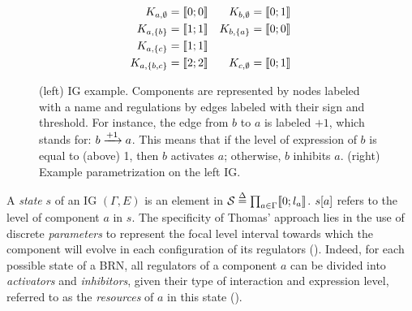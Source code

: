 \begin{figure}[t]
\begin{minipage}{0.4\linewidth}
\centering
{}
\end{minipage}
\begin{minipage}{0.6\linewidth}
\centering
\begin{align*}
K_{a,\emptyset} &= \llbracket 0 ; 0 \rrbracket & K_{b,\emptyset} &= \llbracket 0 ; 1 \rrbracket \\
K_{a,\{b\}} &= \llbracket 1 ; 1 \rrbracket & K_{b,\{a\}} &= \llbracket 0 ; 0 \rrbracket \\
K_{a,\{c\}} &= \llbracket 1 ; 1 \rrbracket &&\\
K_{a,\{b,c\}} &= \llbracket 2 ; 2 \rrbracket & K_{c,\emptyset} &= \llbracket 0 ; 1 \rrbracket
\end{align*}
\end{minipage}
\caption{\label{fig:runningBRN}
(left)
IG example.
Components are represented by nodes labeled with a name
and regulations by edges labeled with their sign and threshold.
For instance, the edge from $b$ to $a$ is labeled $+1$, which stands for: $b \xrightarrow{+ 1} a$.
This means that if the level of expression of $b$ is equal to (\ie above) 1, then $b$ activates $a$;
otherwise, $b$ inhibits $a$.
(right)
Example parametrization on the left IG.
}
\end{figure}

A \emph{state} $s$ of an IG $(\Gamma, E)$ is an element in $\mathcal{S} \stackrel{\Delta}= \prod_{a \in \Gamma} \llbracket 0 ; l_a \rrbracket$.
${s[a]}$ refers to the level of component $a$ in $s$.
The specificity of Thomas' approach lies in the use of discrete \emph{parameters} to represent the
focal level interval towards which the component will evolve in each configuration of its regulators
().
Indeed, for each possible state of a BRN, all regulators of a component $a$ can be divided into
\emph{activators} and \emph{inhibitors}, given their type of interaction and expression level,
referred to as the \emph{resources} of $a$ in this state ().

